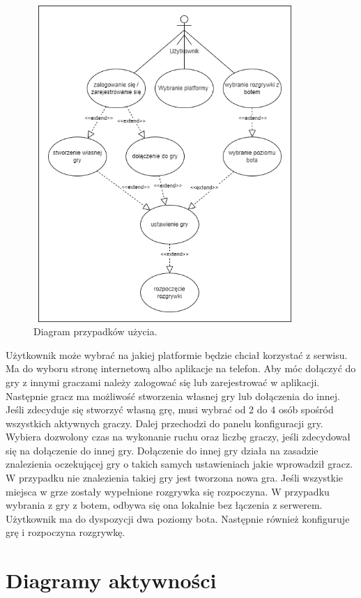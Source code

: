 \begin{figure}[h!]
	\begin{center}
		\includegraphics[width=10cm,height=12cm]{img/przypadki-uzycia.png}
	\end{center}
	\caption{{\color{dgray} Diagram przypadków użycia.}} 
	\label{przypadki_uzycia}
\end{figure} 

Użytkownik może wybrać na jakiej platformie będzie chciał korzystać z serwisu. Ma do wyboru stronę internetową albo aplikacje na telefon. Aby móc dołączyć do gry z innymi graczami należy zalogować się lub zarejestrować w aplikacji. Następnie gracz ma możliwość stworzenia własnej gry lub dołączenia do innej. Jeśli zdecyduje się stworzyć własną grę, musi wybrać od 2 do 4 osób spośród wszystkich aktywnych graczy. Dalej przechodzi do panelu konfiguracji gry. Wybiera dozwolony czas na wykonanie ruchu oraz liczbę graczy, jeśli zdecydował się na dołączenie do innej gry. Dołączenie do innej gry działa na zasadzie znalezienia oczekującej gry o takich samych ustawieniach jakie wprowadził gracz. W przypadku nie znalezienia takiej gry jest tworzona nowa gra. Jeśli wszystkie miejsca w grze zostały wypełnione rozgrywka się rozpoczyna. W przypadku wybrania z gry z botem, odbywa się ona lokalnie bez łączenia z serwerem. Użytkownik ma do dyspozycji dwa poziomy bota. Następnie również konfiguruje grę i rozpoczyna rozgrywkę.

\section{Diagramy aktywności}

